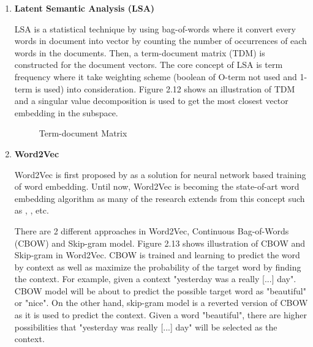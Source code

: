 \documentclass[twoside]{utmthesis}
\begin{document}
\begin{enumerate}
	\item \textbf{Latent Semantic Analysis (LSA)}
	
	LSA is a statistical technique by using bag-of-words where it convert every words in document into vector by counting the number of occurrences of each words in the documents. Then, a term-document matrix (TDM) is constructed for the document vectors. The core concept of LSA is term frequency where it take weighting scheme (boolean of O-term not used and 1-term is used) into consideration. Figure 2.12 shows an illustration of TDM and a singular value decomposition is used to get the most closest vector embedding in the subspace. 
	
	\begin{figure}[H]
		\centering
		\caption{Term-document Matrix}
		\label{fig:termdocumentmatrix}
	\end{figure}
	
	\item \textbf{Word2Vec}
	
	Word2Vec is first proposed by \cite{mikolov2013distributed} as a solution for neural network based training of word embedding. Until now, Word2Vec is becoming the state-of-art word embedding algorithm as many of the research extends from this concept such as \cite{zhang2015chinese}, \cite{lilleberg2015support}, etc. 
	
	There are 2 different approaches in Word2Vec, Continuous Bag-of-Words (CBOW) and Skip-gram model. Figure 2.13 shows illustration of CBOW and Skip-gram in Word2Vec. CBOW is trained and learning to predict the word by context as well as maximize the probability of the target word by finding the context. For example, given a context "yesterday was a really [...] day". CBOW model will be about to predict the possible target word as "beautiful" or "nice". On the other hand, skip-gram model is a reverted version of CBOW as it is used to predict the context. Given a word "beautiful", there are higher possibilities that "yesterday was really [...] day" will be selected as the context.
	

\end{enumerate}
\end{document}
